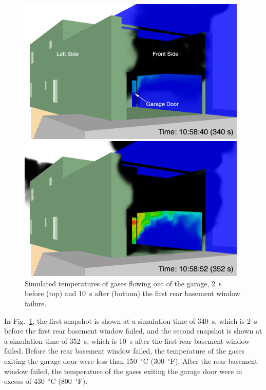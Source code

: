 \documentclass[12pt,oneside]{book}
\begin{document}
\begin{figure}[!ht]
\includegraphics[width=4.3in]{../Figures/SMV_Garage_Temp_340_s}


\includegraphics[width=4.3in]{../Figures/SMV_Garage_Temp_352_s}


\caption[Simulated temperatures in the garage after basement window failure.]
{Simulated temperatures of gases flowing out of the garage, 2~s before (top) and 10~s after (bottom) the first rear basement window failure.}
\label{fig:smv_flow_path_garage}
\end{figure}


\clearpage


In Fig.~\ref{fig:smv_flow_path_garage}, the first snapshot is shown at a simulation time of 340~s, which is 2~s before the first rear basement window failed, and the second snapshot is shown at a simulation time of 352~s, which is 10~s after the first rear basement window failed. Before the rear basement window failed, the temperature of the gases exiting the garage door were less than 150~$^{\circ}$C (300~$^{\circ}$F). After the rear basement window failed, the temperature of the gases exiting the garage door were in excess of 430~$^{\circ}$C (800~$^{\circ}$F).
\end{document}

